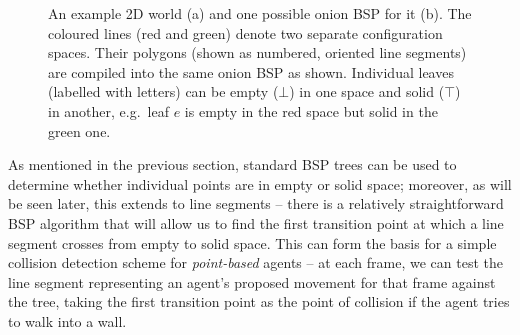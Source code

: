 \documentclass[10pt,twocolumn]{article}
\newenvironment{stusubfig}[1]
{
	\begin{figure}[#1]
	\begin{center}
}
{
	\end{center}
	\end{figure}
}
\begin{document}
\begin{stusubfig}{!t}
	\hspace{12mm}%
\caption{An example 2D world (a) and one possible onion BSP for it (b). The coloured lines (red and green) denote two separate configuration spaces. Their polygons (shown as numbered, oriented line segments) are compiled into the same onion BSP as shown. Individual leaves (labelled with letters) can be empty ($\bot$) in one space and solid ($\top$) in another, e.g.~leaf $e$ is empty in the red space but solid in the green one.}
\label{fig:onion-example}
\end{stusubfig}

As mentioned in the previous section, standard BSP trees can be used to determine whether individual points are in empty or solid space; moreover, as will be seen later, this extends to line segments -- there is a relatively straightforward BSP algorithm that will allow us to find the first transition point at which a line segment crosses from empty to solid space. This can form the basis for a simple collision detection scheme for \emph{point-based} agents -- at each frame, we can test the line segment representing an agent's proposed movement for that frame against the tree, taking the first transition point as the point of collision if the agent tries to walk into a wall.
\end{document}
